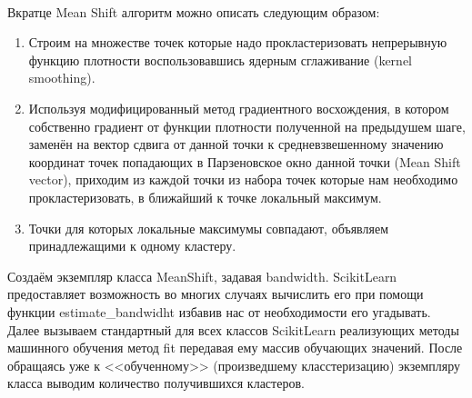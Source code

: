 \documentclass[11pt]{article}
\begin{document}
    \begin{center}
    \end{center}
    { \hspace*{\fill} \\}
    
    Вкратце Mean Shift алгоритм можно описать следующим
образом:

\begin{enumerate}
\item Строим на множестве точек которые надо прокластеризовать непрерывную функцию плотности воспользовавшись ядерным сглаживание (kernel smoothing).
\item Используя модифицированный метод градиентного восхождения, в котором собственно градиент от функции плотности полученной на предыдушем шаге, заменён на вектор сдвига от данной точки к средневзвешенному значению координат точек попадающих в Парзеновское окно данной точки (Mean Shift vector), приходим из каждой точки из набора точек которые нам необходимо прокластеризовать, в ближайший к точке локальный максимум.
\item Точки для которых локальные максимумы совпадают, объявляем принадлежащими к одному кластеру.
\end{enumerate}

    Создаём экземпляр класса MeanShift, задавая bandwidth. ScikitLearn
предоставляет возможность во многих случаях вычислить его при помощи
функции estimate\_bandwidht избавив нас от необходимости его угадывать.
Далее вызываем стандартный для всех классов ScikitLearn реализующих
методы машинного обучения метод fit передавая ему массив обучающих
значений. После обращаясь уже к <<обученному>> (произведшему
класстеризацию) экземпляру класса выводим количество получившихся
кластеров.
\end{document}
